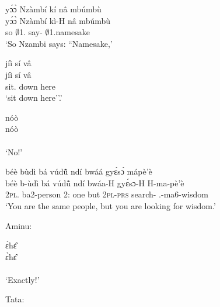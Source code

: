 \begin{exe}[(N234)]
\exN\label{n223}
  \glll yɔ́ɔ̀ Nzàmbí kí nâ mbúmbù \\
        yɔ́ɔ̀ Nzàmbí kì-H nâ mbúmbù \\
         so $\emptyset$1.{\PN} say-{\R} {\COMP} $\emptyset$1.namesake \\
    \trans `So Nzambi says: ``Namesake,'
 
\exN\label{n224}
  \glll jíì sí vâ \\
        jíì sí vâ \\
         sit.{\IMP}  down here \\
    \trans `sit down here''.'
 
\exN\label{n225}
  \glll nóò \\
        nóò \\
         {\EXCL} \\
    \trans `No!'
 
\exN\label{n226}
  \glll béè bùdì bá vúdũ̂ ndí bwáá gyɛ́sɔ́ mápè'è\\
        béè b-ùdì bá vúdũ̂ ndí bwáa-H gyɛ́sɔ-H H-ma-pè'è\\
         2\textsc{pl}.{\COP} ba2-person 2:{\ATT}  one but 2\textsc{pl}-\textsc{prs} search-{\R} {\OBJ}.{\LINK}-ma6-wisdom\\
    \trans `You are the same people, but you are looking for wisdom.'
\end{exe}

\noindent Aminu:

\begin{exe} 
\exN\label{n227}
  \glll ɛ̀hɛ̂ \\
       ɛ̀hɛ̂ \\
        {\EXCL}  \\
    \trans `Exactly!'
\end{exe}

\noindent Tata:


